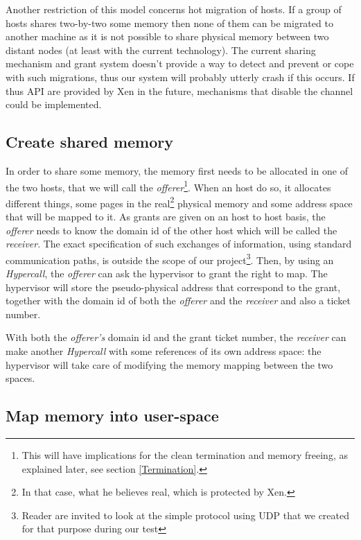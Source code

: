 \documentclass[journal]{IEEEtran}
\begin{document}
Another restriction of this model concerns hot migration of hosts. If a group of hosts shares two-by-two some memory then none of them can be migrated to another machine as it is not possible to share physical memory between two distant nodes (at least with the current technology). The current sharing mechanism and grant system doesn't provide a way to detect and prevent or cope with such migrations, thus our system will probably utterly crash if this occurs. If thus API are provided by Xen in the future, mechanisms that disable the channel could be implemented.

\subsection{Create shared memory}

In order to share some memory, the memory first needs to be allocated in one of the two hosts, that we will call the \emph{offerer}\footnote{This will have implications for the clean termination and memory freeing, as explained later, see section \ref{Termination}.}. When an host do so, it allocates different things, some pages in the real\footnote{In that case, what he believes real, which is protected by Xen.} physical memory and some address space that will be mapped to it. As grants are given on an host to host basis, the \emph{offerer} needs to know the domain id of the other host which will be called the \emph{receiver}. The exact specification of such exchanges of information, using standard communication paths, is outside the scope of our project\footnote{Reader are invited to look at the simple protocol using UDP that we created for that purpose during our test}. Then, by using an \emph{Hypercall}, the \emph{offerer} can ask the hypervisor to grant the right to map. The hypervisor will store the pseudo-physical address that correspond to the grant, together with the domain id of both the \emph{offerer} and the \emph{receiver} and also a ticket number.

With both the \emph{offerer's} domain id and the grant ticket number, the \emph{receiver} can make another \emph{Hypercall} with some references of its own address space: the hypervisor will take care of modifying the memory mapping between the two spaces.

\subsection{Map memory into user-space}
\end{document}
